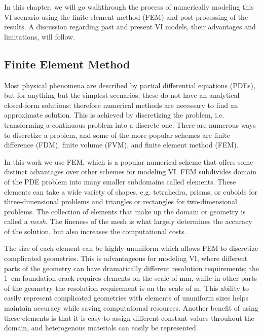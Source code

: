 In this chapter, we will go walkthrough the process of numerically modeling this VI scenario using the finite element method (FEM) and post-processing of the results.
A discussion regarding past and present VI models, their advantages and limitations, will follow.\par

\subsection{Finite Element Method}

Most physical phenomena are described by partial differential equations (PDEs), but for anything but the simplest scenarios, these do not have an analytical closed-form solutions; therefore numerical methods are necessary to find an approximate solution.
This is achieved by discretizing the problem, i.e. transforming a continuous problem into a discrete one.
There are numerous ways to discretize a problem, and some of the more popular schemes are finite difference (FDM), finite volume (FVM), and finite element method (FEM).\par

In this work we use FEM, which is a popular numerical scheme that offers some distinct advantages over other schemes for modeling VI.
FEM subdivides domain of the PDE problem into many smaller subdomains called elements.
These elements can take a wide variety of shapes, e.g. tetrahedra, prisms, or cuboids for three-dimensional problems and triangles or rectangles for two-dimensional problems.
The collection of elements that make up the domain or geometry is called a \textit{mesh}.
The fineness of the mesh is what largely determines the accuracy of the solution, but also increases the computational costs.\par

The size of each element can be highly ununiform which allows FEM to discretize complicated geometries.
This is advantageous for modeling VI, where different parts of the geometry can have dramatically different resolution requirements; the \SI{1}{\centi\metre} foundation crack requires elements on the scale of \si{\milli\metre}, while in other parts of the geometry the resolution requirement is on the scale of \si{\metre}.
This ability to easily represent complicated geometries with elements of ununiform sizes helps maintain accuracy while saving computational resources.
Another benefit of using these elements is that it is easy to assign different constant values throuhout the domain, and heterogenous materials can easily be represented.\par

